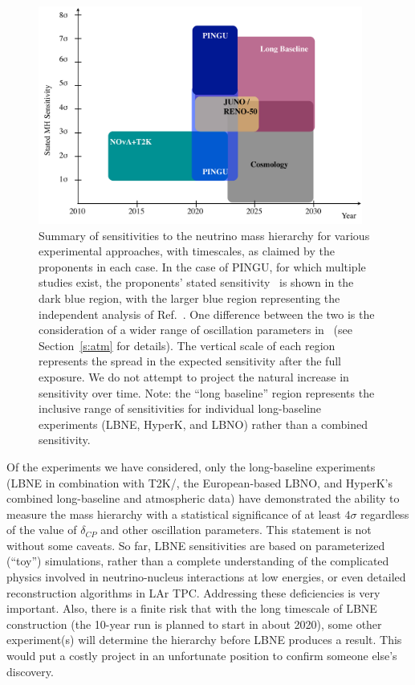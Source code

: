 \begin{figure}[!b]
\begin{center}
\includegraphics[width=0.95\textwidth]{./finalbubbleplot.pdf}
\caption{ Summary of sensitivities to the neutrino mass hierarchy for various experimental approaches, with timescales, as claimed by the proponents in each case.  In the case of PINGU, for which multiple studies exist, the proponents' stated sensitivity~\cite{atm:pingu} is shown in the dark blue region, with the larger blue region representing the independent analysis of Ref.~\cite{atm:Winter}.  One difference between the two is the consideration of a wider range of oscillation parameters in~\cite{atm:Winter}  (see Section~\ref{s:atm} for details).
% 
The vertical scale of each region represents the spread in the expected sensitivity after the full exposure.  We do not attempt to project the natural increase in sensitivity over time. Note: the ``long baseline'' region represents the inclusive range of sensitivities for individual long-baseline experiments (LBNE, HyperK, and LBNO) rather than a combined sensitivity.
\label{f:bubble}}
\end{center}
\end{figure} 

Of the experiments we have considered, only the long-baseline 
experiments (LBNE in combination with T2K/\NOvA, the European-based LBNO, and HyperK's combined long-baseline and atmospheric data) have demonstrated the
ability to measure the mass hierarchy with a statistical significance
of at least $4\sigma$ regardless of the
value of $\delta_{CP}$ and other oscillation parameters. This statement is not without some
caveats. So far, LBNE sensitivities are based on parameterized
(``toy'') simulations, rather than a complete understanding of
the complicated physics involved in neutrino-nucleus interactions at low
energies, or even detailed reconstruction algorithms in LAr
TPC. Addressing these deficiencies is very important. Also, there is a
finite risk that with the long
timescale of LBNE construction (the 10-year run is planned to start in
about 2020), some other experiment(s) will determine the hierarchy
before LBNE produces a result. This would put a costly project in an
unfortunate position to confirm someone else's discovery. 

